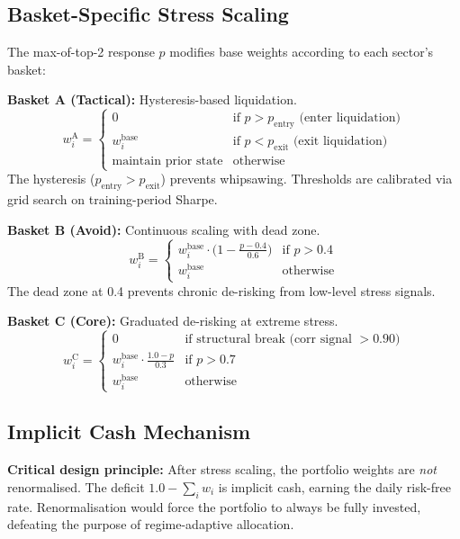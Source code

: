 \documentclass[11pt,a4paper]{article}
\begin{document}
\subsection{Basket-Specific Stress Scaling}

The max-of-top-2 response $p$ modifies base weights according to each sector's basket:

\textbf{Basket A (Tactical):} Hysteresis-based liquidation.
\begin{equation}
  w_i^{\mathrm{A}} = \begin{cases}
    0 & \text{if } p > p_{\mathrm{entry}} \text{ (enter liquidation)} \\
    w_i^{\mathrm{base}} & \text{if } p < p_{\mathrm{exit}} \text{ (exit liquidation)} \\
    \text{maintain prior state} & \text{otherwise}
  \end{cases}
\end{equation}
The hysteresis ($p_{\mathrm{entry}} > p_{\mathrm{exit}}$) prevents whipsawing. Thresholds are calibrated via grid search on training-period Sharpe.

\textbf{Basket B (Avoid):} Continuous scaling with dead zone.
\begin{equation}
  w_i^{\mathrm{B}} = \begin{cases}
    w_i^{\mathrm{base}} \cdot \Big(1 - \frac{p - 0.4}{0.6}\Big) & \text{if } p > 0.4 \\
    w_i^{\mathrm{base}} & \text{otherwise}
  \end{cases}
\end{equation}
The dead zone at 0.4 prevents chronic de-risking from low-level stress signals.

\textbf{Basket C (Core):} Graduated de-risking at extreme stress.
\begin{equation}
  w_i^{\mathrm{C}} = \begin{cases}
    0 & \text{if structural break (corr signal $> 0.90$)} \\
    w_i^{\mathrm{base}} \cdot \frac{1.0 - p}{0.3} & \text{if } p > 0.7 \\
    w_i^{\mathrm{base}} & \text{otherwise}
  \end{cases}
\end{equation}

\subsection{Implicit Cash Mechanism}

\textbf{Critical design principle:} After stress scaling, the portfolio weights are \emph{not} renormalised. The deficit $1.0 - \sum_i w_i$ is implicit cash, earning the daily risk-free rate. Renormalisation would force the portfolio to always be fully invested, defeating the purpose of regime-adaptive allocation.
\end{document}
